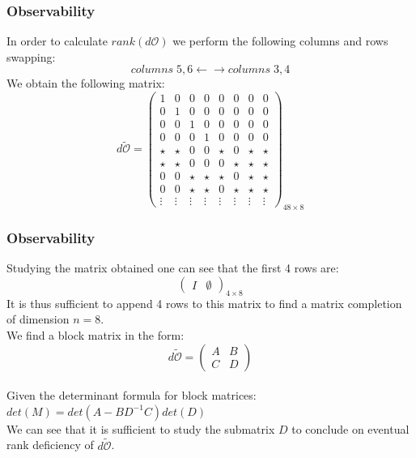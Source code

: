 %
\begin{frame}
\frametitle{Observability}
In order to calculate $rank(d\mathcal{O})$ we perform the following columns and rows swapping:
\begin{equation*}
columns\;5,6 \leftarrow\rightarrow columns\;3,4
\end{equation*}
We obtain the following matrix:
\begin{equation*}
	d\tilde{\mathcal{O}} =%
	\begin{pmatrix}
		1 &0 &0 &0 &0 &0 &0 &0 \\
		0 &1 &0 &0 &0 &0 &0 &0 \\
		0 &0 &1 &0 &0 &0 &0 &0 \\
		0 &0 &0 &1 &0 &0 &0 &0 \\
	    \star &\star &0 &0 &\star &0 &\star &\star \\
		\star &\star &0 &0 &0 &\star &\star &\star \\
		0 &0 &\star &\star &\star &0 &\star &\star \\
		0 &0 &\star &\star &0 &\star &\star &\star \\
		\vdots &\vdots &\vdots &\vdots &\vdots &\vdots &\vdots &\vdots
	\end{pmatrix}_{48\times8}
\end{equation*}
\end{frame}
%
\begin{frame}
\frametitle{Observability}
Studying the matrix obtained one can see that the first 4 rows are:
\[
\begin{pmatrix}
I &\emptyset
\end{pmatrix}_{4\times8}
\]
It is thus sufficient to append 4 rows to this matrix to find a matrix completion of dimension $n=8$.\\
We find a block matrix in the form:
\begin{equation*}
	d\tilde{\mathcal{O}} =%
	\begin{pmatrix}
		A &B \\
        C &D
	\end{pmatrix}
\end{equation*}\\[8pt]
Given the determinant formula for block matrices: $det(M) = det(A-BD^{-1}C)det(D)$\\[8pt] We can see that it is sufficient to study the submatrix $D$ to conclude on eventual rank deficiency of $d\tilde{\mathcal{O}}$.
\end{frame}
%
